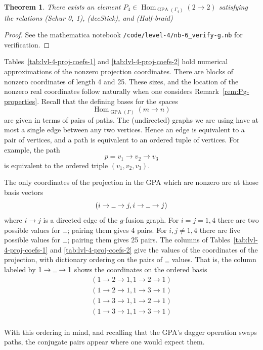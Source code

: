 \documentclass[pdflatex,sn-mathphys-num]{sn-jnl}%
\theoremstyle{thmstyleone}%
\newtheorem{theorem}{Theorem}
\theoremstyle{thmstyletwo}%
\theoremstyle{thmstylethree}%
\DeclareMathOperator{\Hom}{Hom}
\DeclareMathOperator{\GPA}{GPA}
\newcommand{\blank}{\rule{0.2cm}{0.15mm}}
\begin{document}
\begin{theorem}\label{thm:init-D4-GPA-emb}
    There exists an element $P_4 \in\Hom_{\GPA(\Gamma_4)}(2\to 2)$ satisfying the relations
    (Schur 0, 1), (decStick), and (Half-braid)
\end{theorem}
\begin{proof}
    See the mathematica notebook \verb|/code/level-4/nb-6_verify-g.nb| for verification.
\end{proof}



Tables~\ref{tab:lvl-4-proj-coefs-1} and \ref{tab:lvl-4-proj-coefs-2} hold numerical approximations 
of the nonzero projection coordinates.
There are blocks of nonzero coordinates of length 4 and 25. 
These sizes, and the location of the nonzero real coordinates follow naturally 
when one considers Remark~\ref{rem:Pg-properties}.
Recall that the defining bases for the spaces 
\[
    \Hom_{\GPA(\Gamma)}(m\to n)
\]
are given in terms of pairs of paths. 
The (undirected) graphs we are using have at most a single edge between any two vertices. 
Hence an edge is equivalent to a pair of vertices, and a path is equivalent to an ordered tuple of vertices. 
For example, the path
\[
    p = v_1 \longrightarrow v_2 \longrightarrow v_3
\]
is equivalent to the ordered triple $(v_1,v_2,v_3)$. 

The only coordinates of the projection in the GPA which are nonzero are at those basis vectors 
\[
    (i \to\blank\to j, i \to\blank\to j)
\]
where $i\to j$ is a directed edge of the $g$-fusion graph. 
For $i=j=1,4$ there are two possible values for $\blank$; pairing them gives 4 pairs. 
For $i,j\neq 1,4$ there are five possible values for $\blank$; pairing them gives 25 pairs. 
The columns of Tables~\ref{tab:lvl-4-proj-coefs-1} and \ref{tab:lvl-4-proj-coefs-2} give the 
values of the coordinates of the projection, 
with dictionary ordering on the pairs of $\blank$ values. 
That is, the column labeled by $1\to\blank\to1$ shows the coordinates on the ordered basis
\begin{align*}
    (1\to 2 \to1, 1\to 2 \to1) \\
    (1\to 2 \to1, 1\to 3 \to1) \\
    (1\to 3 \to1, 1\to 2 \to1) \\
    (1\to 3 \to1, 1\to 3 \to1) \\
\end{align*}

With this ordering in mind, and recalling that the GPA's dagger operation swaps paths, 
the conjugate pairs appear where one would expect them.
\end{document}
